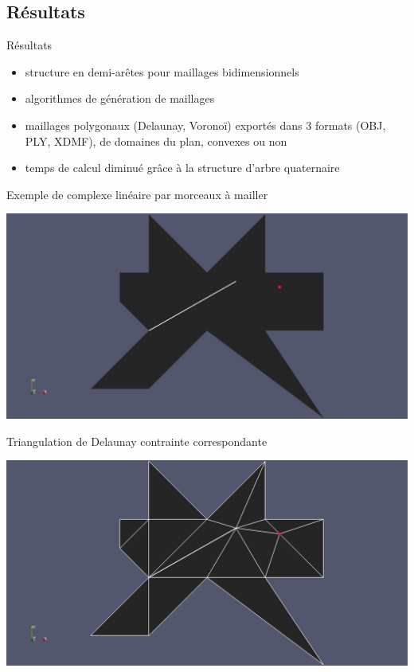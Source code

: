 \documentclass[aspectratio=169, 12pt, a4paper, hyperref={pdfauthor={Alexandre MARIN}, pdfkeywords={IFPEN, Delaunay, Voronoi, mesh generation}, colorlinks=true, linkcolor=purple, urlcolor=blue, citecolor=magenta}]{beamer}
\begin{document}
\subsection{Résultats}
\begin{Energie}{Résultats}
\begin{itemize}
\item structure en demi-arêtes pour maillages bidimensionnels
\item algorithmes de génération de maillages
\item maillages polygonaux (Delaunay, Voronoï) exportés dans $3$ formats (OBJ, PLY, XDMF), de domaines du plan, convexes ou non
\item temps de calcul diminué grâce à la structure d'arbre quaternaire
\end{itemize}
\end{Energie}

\begin{Energie}{\normalsize Exemple de complexe linéaire par morceaux à mailler}
\begin{center}
\includegraphics[scale=0.18, viewport=430 0 1800 1129, clip]{odd_plc.jpg}
\end{center}
\end{Energie}

\begin{Energie}{\normalsize Triangulation de Delaunay contrainte correspondante}
\begin{center}
\includegraphics[scale=0.18, viewport=430 0 1800 1129, clip]{odd_cdt.jpg}
\end{center}
\end{Energie}
\end{document}

